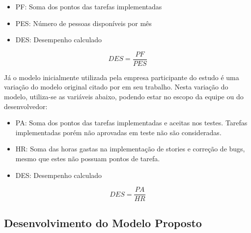 \begin{itemize}
    \item PF: Soma dos pontos das tarefas implementadas
    \item PES: Número de pessoas disponíveis por mês
    \item DES: Desempenho calculado
\end{itemize}

\begin{equation}
    DES = \frac{PF}{PES}
\end{equation}

\bigskip

Já o modelo inicialmente utilizada pela empresa participante do estudo é uma variação do modelo original citado por \citeauthor{barbaran1998indicadores} em seu trabalho. Nesta variação do modelo, utiliza-se as variáveis abaixo, podendo estar no escopo da equipe ou do desenvolvedor:

\begin{itemize}
    \item PA: Soma dos pontos das tarefas implementadas e aceitas nos testes. Tarefas implementadas porém não aprovadas em teste não são consideradas.
    \item HR: Soma das horas gastas na implementação de stories e correção de bugs, mesmo que estes não possuam pontos de tarefa.
    \item DES: Desempenho calculado
\end{itemize}


\begin{equation}
    DES = \frac{PA}{HR}
\end{equation}

\bigskip

\subsection{Desenvolvimento do Modelo Proposto}

